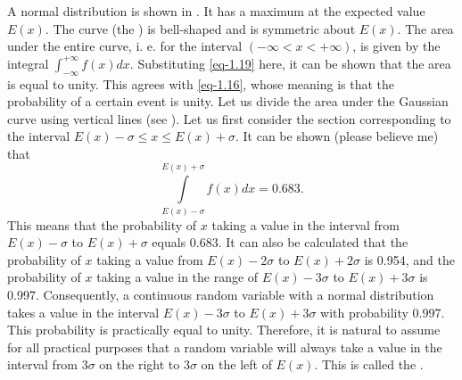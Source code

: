   A normal distribution is shown in
. It has a maximum at the expected value $E
(x)$. The curve (the ) is bell-shaped and is
symmetric about $E (x)$. The area under the entire curve, i. e. for
the interval $(- \infty < x < + \infty )$, is given by the integral
$ \int_{- \infty}^{+ \infty} f(x) dx$.  Substituting \eqref{eq-1.19}
here, it can be shown that the area is equal to unity. This agrees
with \eqref{eq-1.16}, whose meaning is that the probability of a certain event
is unity. Let us divide the area under the Gaussian curve using
vertical lines (see ). Let us first consider the section
corresponding to the interval  $E (x) -  \sigma  \leq x \leq E(x) + \sigma $. It can be shown (please believe me) that 
\begin{equation*}
\int\limits_{E(x) - \sigma}^{E(x) + \sigma} f(x) dx = 0.683. 
\end{equation*}
This means that the probability of $x$ taking a value in the interval from $E
(x) - \sigma$ to $E (x) + \sigma $ equals 0.683. It can also be calculated that
the probability of $x$ taking a value from $E (x) - 2 \sigma$ to $E
(x) + 2 \sigma $ is 0.954, and the probability of $x$ taking a value in the range of $E (x) - 3 \sigma $ to $E (x) + 3 \sigma $ is 0.997. Consequently, a continuous random variable with a normal distribution takes a value in the interval $E (x) - 3 \sigma $ to $ E(x) + 3 \sigma $ with probability 0.997. This probability is practically equal to unity. Therefore, it is natural to assume for
all practical purposes that a random variable will always take a value in the interval from $3 \sigma$ on the right to $3 \sigma$ on the left of $E (x)$. This is called the .
